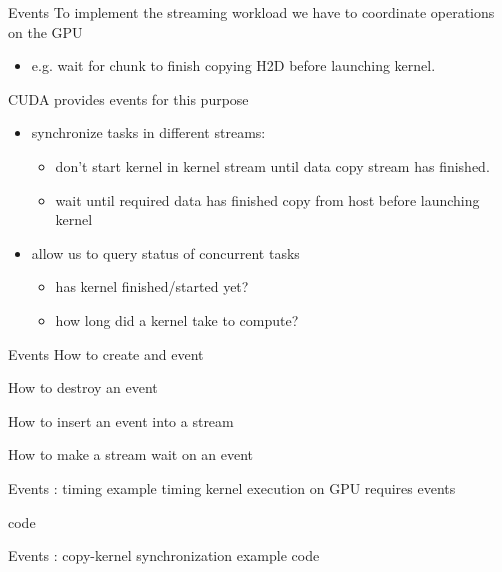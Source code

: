\begin{frame}[fragile]{Events}
    To implement the streaming workload we have to coordinate operations on the GPU
    \begin{itemize}
        \item e.g. wait for chunk to finish copying H2D before launching kernel.
    \end{itemize}

    CUDA provides events for this purpose
    \begin{itemize}
        \item synchronize tasks in different streams:
        \begin{itemize}
            \item don't start kernel in kernel stream until data copy stream has finished.
            \item wait until required data has finished copy from host before launching kernel
        \end{itemize}
        \item allow us to query status of concurrent tasks
        \begin{itemize}
            \item has kernel finished/started yet?
            \item how long did a kernel take to compute?
        \end{itemize}
    \end{itemize}
\end{frame}

\begin{frame}[fragile]{Events}
    How to create and event

    How to destroy an event

    How to insert an event into a stream

    How to make a stream wait on an event
\end{frame}

\begin{frame}[fragile]{Events : timing example}
    timing kernel execution on GPU requires events

    code
\end{frame}

\begin{frame}[fragile]{Events : copy-kernel synchronization example}
    code
\end{frame}

